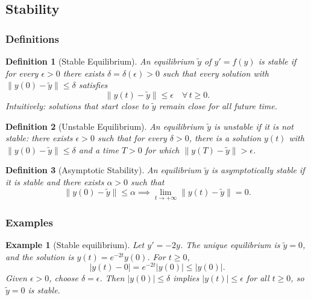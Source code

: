 \documentclass{article}
\newtheorem{definition}{Definition}
\newtheorem*{example}{Example}
\begin{document}
\subsection{Stability}

\subsubsection{Definitions}

\begin{definition}[Stable Equilibrium]
    An equilibrium $\tilde{y}$ of $y' = f(y)$ is \emph{stable} if for every $\epsilon > 0$ there exists $\delta = \delta(\epsilon) > 0$ such that every solution with $\|y(0) - \tilde{y}\| \leq \delta$ satisfies
    \[\|y(t) - \tilde{y}\| \leq \epsilon \quad \forall\, t \geq 0.\]
    Intuitively: solutions that start close to $\tilde{y}$ remain close for all future time.
\end{definition}

\begin{definition}[Unstable Equilibrium]
    An equilibrium $\tilde{y}$ is \emph{unstable} if it is not stable: there exists $\epsilon > 0$ such that for every $\delta > 0$, there is a solution $y(t)$ with $\|y(0) - \tilde{y}\| \leq \delta$ and a time $T > 0$ for which $\|y(T) - \tilde{y}\| > \epsilon$.
\end{definition}

\begin{definition}[Asymptotic Stability]
    An equilibrium $\tilde{y}$ is \emph{asymptotically stable} if it is stable and there exists $\alpha > 0$ such that
    \[\|y(0) - \tilde{y}\| \leq \alpha \implies \lim_{t \to +\infty} \|y(t) - \tilde{y}\| = 0.\]
\end{definition}

\subsubsection{Examples}

\begin{example}[Stable equilibrium]
    Let $y' = -2y$. The unique equilibrium is $\tilde{y} = 0$, and the solution is $y(t) = e^{-2t}y(0)$. For $t \geq 0$,
    \[|y(t) - 0| = e^{-2t}|y(0)| \leq |y(0)|.\]
    Given $\epsilon > 0$, choose $\delta = \epsilon$. Then $|y(0)| \leq \delta$ implies $|y(t)| \leq \epsilon$ for all $t \geq 0$, so $\tilde{y} = 0$ is stable.
\end{example}
\end{document}
